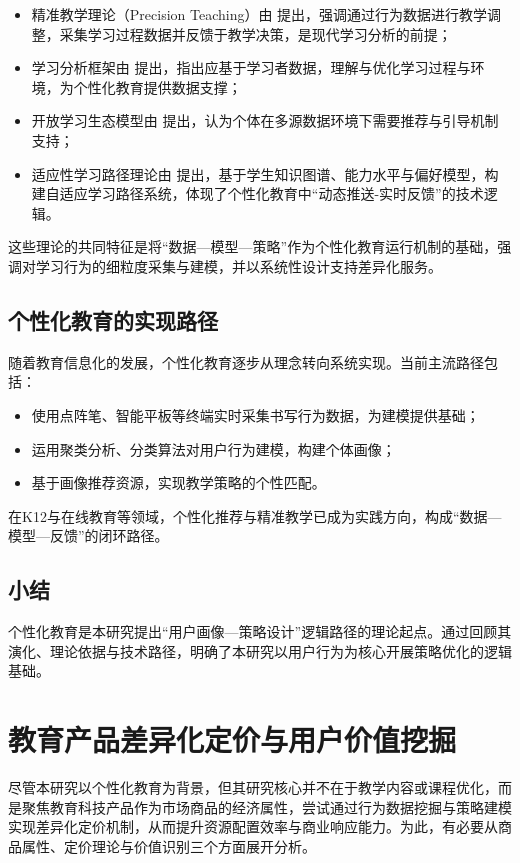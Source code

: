 \begin{itemize}
\item 精准教学理论（Precision Teaching）由 \cite{kubina2012precision}提出，强调通过行为数据进行教学调整，采集学习过程数据并反馈于教学决策，是现代学习分析的前提；
\item 学习分析框架由 \cite{unesco2022analytics}提出，指出应基于学习者数据，理解与优化学习过程与环境，为个性化教育提供数据支撑；
\item 开放学习生态模型由 \cite{siemens2011openlearning}提出，认为个体在多源数据环境下需要推荐与引导机制支持；
\item 适应性学习路径理论由 \cite{chen2020adaptivepath}提出，基于学生知识图谱、能力水平与偏好模型，构建自适应学习路径系统，体现了个性化教育中“动态推送-实时反馈”的技术逻辑。
\end{itemize}

这些理论的共同特征是将“数据—模型—策略”作为个性化教育运行机制的基础，强调对学习行为的细粒度采集与建模，并以系统性设计支持差异化服务。

\subsection{个性化教育的实现路径}
随着教育信息化的发展，个性化教育逐步从理念转向系统实现。当前主流路径包括：

\begin{itemize}
\item 使用点阵笔、智能平板等终端实时采集书写行为数据，为建模提供基础；
\item 运用聚类分析、分类算法对用户行为建模，构建个体画像；
\item 基于画像推荐资源，实现教学策略的个性匹配。
\end{itemize}

在K12与在线教育等领域，个性化推荐与精准教学已成为实践方向，构成“数据—模型—反馈”的闭环路径。

\subsection*{小结}
个性化教育是本研究提出“用户画像—策略设计”逻辑路径的理论起点。通过回顾其演化、理论依据与技术路径，明确了本研究以用户行为为核心开展策略优化的逻辑基础。

\section{教育产品差异化定价与用户价值挖掘}
\label{sec:教育产品定价与价值建模}

尽管本研究以个性化教育为背景，但其研究核心并不在于教学内容或课程优化，而是聚焦教育科技产品作为市场商品的经济属性，尝试通过行为数据挖掘与策略建模实现差异化定价机制，从而提升资源配置效率与商业响应能力。为此，有必要从商品属性、定价理论与价值识别三个方面展开分析。

